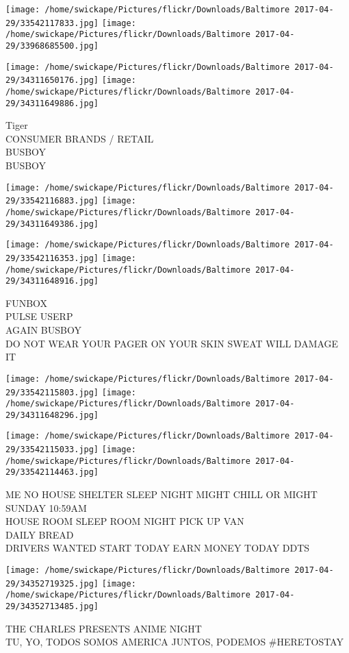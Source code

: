 \documentclass[10pt,letterpaper]{article}
\begin{document}
\texttt{[image: /home/swickape/Pictures/flickr/Downloads/Baltimore 2017-04-29/33542117833.jpg]}
\texttt{[image: /home/swickape/Pictures/flickr/Downloads/Baltimore 2017-04-29/33968685500.jpg]}

\texttt{[image: /home/swickape/Pictures/flickr/Downloads/Baltimore 2017-04-29/34311650176.jpg]}
\texttt{[image: /home/swickape/Pictures/flickr/Downloads/Baltimore 2017-04-29/34311649886.jpg]}

Tiger\\
CONSUMER BRANDS / RETAIL\\
BUSBOY\\
BUSBOY\\
\pagebreak

\texttt{[image: /home/swickape/Pictures/flickr/Downloads/Baltimore 2017-04-29/33542116883.jpg]}
\texttt{[image: /home/swickape/Pictures/flickr/Downloads/Baltimore 2017-04-29/34311649386.jpg]}

\texttt{[image: /home/swickape/Pictures/flickr/Downloads/Baltimore 2017-04-29/33542116353.jpg]}
\texttt{[image: /home/swickape/Pictures/flickr/Downloads/Baltimore 2017-04-29/34311648916.jpg]}

FUNBOX\\
PULSE USERP\\
AGAIN BUSBOY\\
DO NOT WEAR YOUR PAGER ON YOUR SKIN SWEAT WILL DAMAGE IT\\
\pagebreak

\texttt{[image: /home/swickape/Pictures/flickr/Downloads/Baltimore 2017-04-29/33542115803.jpg]}
\texttt{[image: /home/swickape/Pictures/flickr/Downloads/Baltimore 2017-04-29/34311648296.jpg]}

\texttt{[image: /home/swickape/Pictures/flickr/Downloads/Baltimore 2017-04-29/33542115033.jpg]}
\texttt{[image: /home/swickape/Pictures/flickr/Downloads/Baltimore 2017-04-29/33542114463.jpg]}

ME NO HOUSE SHELTER SLEEP NIGHT MIGHT CHILL OR MIGHT SUNDAY 10:59AM\\
HOUSE ROOM SLEEP ROOM NIGHT PICK UP VAN\\
DAILY BREAD\\
DRIVERS WANTED START TODAY EARN MONEY TODAY DDTS\\
\pagebreak

\texttt{[image: /home/swickape/Pictures/flickr/Downloads/Baltimore 2017-04-29/34352719325.jpg]}
\texttt{[image: /home/swickape/Pictures/flickr/Downloads/Baltimore 2017-04-29/34352713485.jpg]}

THE CHARLES PRESENTS ANIME NIGHT\\
TU, YO, TODOS SOMOS AMERICA JUNTOS, PODEMOS \#HERETOSTAY\\
\pagebreak
\end{document}
